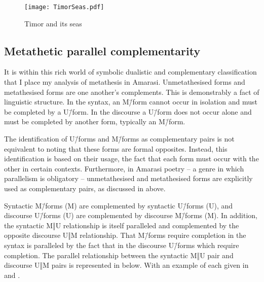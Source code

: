 \begin{figure}[h]
	\caption{Timor and its seas}\label{fig:TimSea}
	\texttt{[image: TimorSeas.pdf]}
\end{figure}

\subsection{Metathetic parallel complementarity}\label{sec:MetParCom}
It is within this rich world of symbolic dualistic and complementary
classification that I place my analysis of metathesis in Amarasi.
Unmetathesised forms and metathesised forms are one another's complements.
This is demonstrably a fact of linguistic structure.
In the syntax, an M\=/form cannot occur in isolation and must be completed by a U\=/form.
In the discourse a U\=/form does not occur alone
and must be completed by another form, typically an M\=/form.

The identification of U\=/forms and M\=/forms as complementary pairs
is not equivalent to noting that these forms are formal opposites.
Instead, this identification is based on their usage,
the fact that each form must occur with the other in certain contexts.
Furthermore, in Amarasi poetry
-- a genre in which parallelism is obligatory --
unmetathesised and metathesised forms
are explicitly used as complementary pairs,
as discussed in  above. %

Syntactic M\=/forms (M) are complemented by syntactic U\=/forms (U),
and discourse U\=/forms (U) are complemented by discourse M\=/forms (M).
In addition, the syntactic M‖U relationship
is itself paralleled and complemented by the opposite discourse U‖M relationship.
That M\=/forms require completion in the syntax is paralleled by the fact
that in the discourse U\=/forms which require completion.
The parallel relationship between the syntactic M‖U pair
and discourse U‖M pairs is represented in  below.
With an example of each given in  and .


